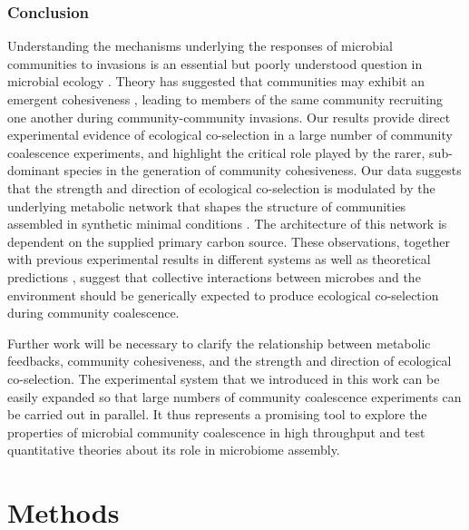 \documentclass[a4paper,10pt]{article}
\begin{document}
\subsubsection*{Conclusion}

Understanding the mechanisms underlying the responses of microbial communities to invasions is
an essential but poorly understood question in microbial ecology \cite{Rillig2015}.
Theory has suggested that communities may exhibit an emergent cohesiveness
\cite{Gilpin1994,Livingston2013,Tikhonov2016,Tikhonov2017},
leading to members of the same community recruiting one another during
community-community invasions.
Our results provide direct experimental evidence of ecological co-selection in a large number
of community coalescence experiments,
and highlight the critical role played by the rarer, sub-dominant species in the generation
of community cohesiveness.
Our data suggests that the strength and direction of ecological co-selection is modulated
by the underlying metabolic network that shapes the structure of
communities assembled in synthetic minimal conditions
\cite{Goldford2018,Estrela2020}.
The architecture of this network is dependent on the supplied primary carbon source.
These observations,
together with previous experimental results in different systems \cite{Sierocinski2017} as well as
theoretical predictions
\cite{Gilpin1994,Toquenaga1997,Tikhonov2016,Tikhonov2017,Vila2019,Lechon2021},
suggest that collective interactions between microbes
and the environment should be generically expected to produce ecological co-selection
during community coalescence.

Further work will be necessary to clarify the relationship between
metabolic feedbacks, community cohesiveness, and
the strength and direction of ecological co-selection.
The experimental system that we introduced in this work can be easily expanded so that
large numbers of community coalescence experiments can be carried out in parallel.
It thus represents a promising tool to explore the properties of microbial community
coalescence in high throughput
and test quantitative theories about its role in microbiome assembly.

\clearpage











\section*{Methods}\label{methods}
\end{document}
